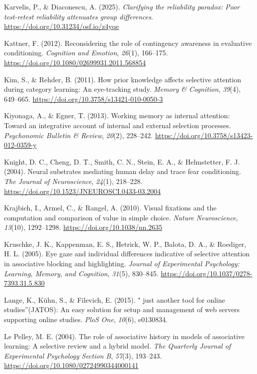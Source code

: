\documentclass[
  man,
  floatsintext,
  longtable,
  nolmodern,
  notxfonts,
  notimes,
  mask,
  colorlinks=true,linkcolor=blue,citecolor=blue,urlcolor=blue]{apa7}
\newlength{\cslhangindent}
\newenvironment{CSLReferences}[2] %
 {\begin{list}{}{%
  \setlength{\itemindent}{0pt}
  \setlength{\leftmargin}{0pt}
  \setlength{\parsep}{0pt}
  \ifodd #1
   \setlength{\leftmargin}{\cslhangindent}
   \setlength{\itemindent}{-1\cslhangindent}
  \fi
  \setlength{\itemsep}{#2\baselineskip}}}
 {\end{list}}
\begin{document}
\begin{CSLReferences}{1}{0}
Karvelis, P., \& Diaconescu, A. (2025). \emph{Clarifying the reliability
paradox: Poor test-retest reliability attenuates group differences}.
\url{https://doi.org/10.31234/osf.io/z4yqe}

Kattner, F. (2012). Reconsidering the role of contingency awareness in
evaluative conditioning. \emph{Cognition and Emotion}, \emph{26}(1),
166--175. \url{https://doi.org/10.1080/02699931.2011.568854}

Kim, S., \& Rehder, B. (2011). How prior knowledge affects selective
attention during category learning: An eye-tracking study. \emph{Memory
\& Cognition}, \emph{39}(4), 649--665.
\url{https://doi.org/10.3758/s13421-010-0050-3}

Kiyonaga, A., \& Egner, T. (2013). Working memory as internal attention:
Toward an integrative account of internal and external selection
processes. \emph{Psychonomic Bulletin \& Review}, \emph{20}(2),
228--242. \url{https://doi.org/10.3758/s13423-012-0359-y}

Knight, D. C., Cheng, D. T., Smith, C. N., Stein, E. A., \& Helmstetter,
F. J. (2004). Neural substrates mediating human delay and trace fear
conditioning. \emph{The Journal of Neuroscience}, \emph{24}(1),
218--228. \url{https://doi.org/10.1523/JNEUROSCI.0433-03.2004}

Krajbich, I., Armel, C., \& Rangel, A. (2010). Visual fixations and the
computation and comparison of value in simple choice. \emph{Nature
Neuroscience}, \emph{13}(10), 1292--1298.
\url{https://doi.org/10.1038/nn.2635}

Kruschke, J. K., Kappenman, E. S., Hetrick, W. P., Balota, D. A., \&
Roediger, H. L. (2005). Eye gaze and individual differences indicative
of selective attention in associative blocking and highlighting.
\emph{Journal of Experimental Psychology: Learning, Memory, and
Cognition}, \emph{31}(5), 830--845.
\url{https://doi.org/10.1037/0278-7393.31.5.830}

Lange, K., Kühn, S., \& Filevich, E. (2015). {"} just another tool for
online studies{''}(JATOS): An easy solution for setup and management of
web servers supporting online studies. \emph{PloS One}, \emph{10}(6),
e0130834.

Le Pelley, M. E. (2004). The role of associative history in models of
associative learning: A selective review and a hybrid model. \emph{The
Quarterly Journal of Experimental Psychology Section B}, \emph{57}(3),
193--243. \url{https://doi.org/10.1080/02724990344000141}


\end{CSLReferences}
\end{document}
